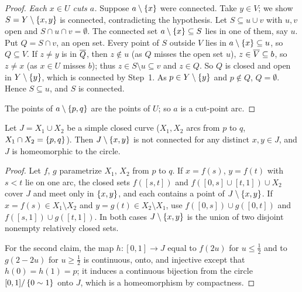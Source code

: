 \begin{proof}
\emph{Each $x\in U$ cuts $a$.} Suppose $a\setminus\left\{ x \right\}$ were connected. Take $y\in V$; we show
$S=Y\setminus\left\{ x,y \right\}$ is connected, contradicting the hypothesis. Let $S\subseteq u\cup v$ with
$u,v$ open and $S\cap u\cap v=\emptyset$. The connected set $a\setminus\left\{ x \right\}\subseteq S$ lies in
one of them, say $u$. Put $Q=S\cap v$, an open set. Every point of $S$ outside $V$ lies in
$a\setminus\left\{ x \right\}\subseteq u$, so $Q\subseteq V$. If $z\ne y$ is in $\overline{Q}$, then $z\notin u$
(as $Q$ misses the open set $u$), $z\in\overline{V}\subseteq b$, so $z\ne x$ (as $x\in U$ misses $b$); thus
$z\in S\setminus u\subseteq v$ and $z\in Q$. So $Q$ is closed and open in $Y\setminus\left\{ y \right\}$, which
is connected by Step~1. As $p\in Y\setminus\left\{ y \right\}$ and $p\notin Q$, $Q=\emptyset$. Hence
$S\subseteq u$, and $S$ is connected.

The points of $a\setminus\left\{ p,q \right\}$ are the points of $U$; so $a$ is a cut-point arc.
\end{proof}


\begin{proposition}\label{prop:scc-cut}
Let $J=X_1\cup X_2$ be a simple closed curve ($X_1,X_2$ arcs from $p$ to $q$, $X_1\cap
X_2=\left\{ p,q \right\}$). Then $J\setminus\left\{ x,y \right\}$ is not connected for any distinct $x,y\in J$, and $J$
is homeomorphic to the circle.
\end{proposition}

\begin{proof}
Let $f$, $g$ parametrize $X_1$, $X_2$ from $p$ to $q$. If $x=f(s)$, $y=f(t)$ with $s<t$ lie on one
arc, the closed sets $f([s,t])$ and $f([0,s]\cup[t,1])\cup X_2$ cover $J$ and meet only in $\left\{ x,y \right\}$,
and each contains a point of $J\setminus\left\{ x,y \right\}$. If $x=f(s)\in X_1\setminus X_2$ and $y=g(t)\in
X_2\setminus X_1$, use $f([0,s])\cup g([0,t])$ and $f([s,1])\cup g([t,1])$. In both cases
$J\setminus\left\{ x,y \right\}$ is the union of two disjoint nonempty relatively closed sets.

For the second claim, the map $h\colon[0,1]\to J$ equal to $f(2u)$ for $u\le\frac12$ and to
$g(2-2u)$ for $u\ge\frac12$ is continuous, onto, and injective except that $h(0)=h(1)=p$; it
induces a continuous bijection from the circle $[0,1]/\left\{ 0\sim1 \right\}$ onto $J$, which is a
homeomorphism by compactness.
\end{proof}



